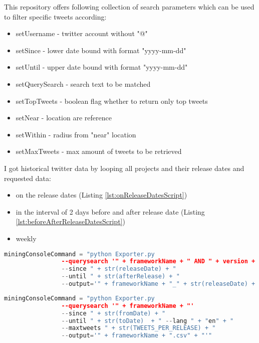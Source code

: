 This repository offers following collection of search parameters which can be used to filter specific tweets according:
\begin{itemize}
  \item setUsername - twitter account without "@"
  \item setSince - lower date bound with format "yyyy-mm-dd"
  \item setUntil - upper date bound with format "yyyy-mm-dd"
  \item setQuerySearch - search text to be matched
  \item setTopTweets - boolean flag whether to return only top tweets
  \item setNear - location are reference 
  \item setWithin - radius from "near" location
  \item setMaxTweets - max amount of tweets to be retrieved
\end{itemize}


I got historical twitter data by looping all projects and their release dates and requested data: 

\begin{itemize}
  \item on the release dates (Listing \ref{lst:onReleaseDatesScript})
  \item in the interval of 2 days before and after  release date (Listing \ref{lst:beforeAfterReleaseDatesScript})
  \item weekly
\end{itemize}


\begin{lstlisting}[caption={Creating command to get Tweets about a project version on release dates},label={lst:onReleaseDatesScript},language=Python]
miningConsoleCommand = "python Exporter.py 
				--querysearch '" + frameworkName + " AND " + version + "' 
				--since " + str(releaseDate) + " 
				--until " + str(afterRelease) + " 
				--output='" + frameworkName + "_" + str(releaseDate) + ".csv" + "'"
\end{lstlisting}


\begin{lstlisting}[caption={Creating command to get Tweets about a project version in particular time interval around release date},label={lst:beforeAfterReleaseDatesScript},language=Python]
miningConsoleCommand = "python Exporter.py 
				--querysearch '" + frameworkName + "' 
				--since " + str(fromDate) + " 
				--until " + str(toDate)  + " --lang " + "en" + " 
				--maxtweets " + str(TWEETS_PER_RELEASE) + " 
				--output='" + frameworkName + ".csv" + "'"
\end{lstlisting}


